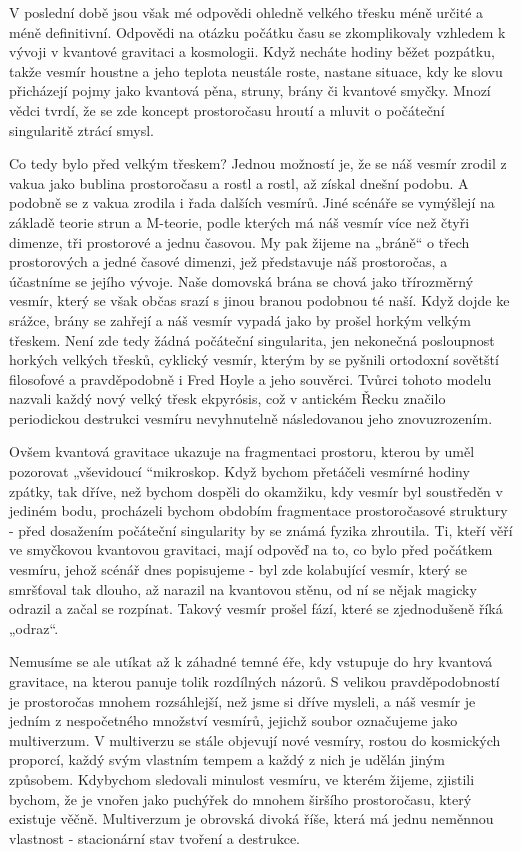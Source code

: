   V poslední době jsou však mé odpovědi ohledně velkého třesku méně určité a méně definitivní.
  Odpovědi na otázku počátku času se zkomplikovaly vzhledem k vývoji v kvantové gravitaci a
  kosmologii. Když necháte hodiny běžet pozpátku, takže vesmír houstne a jeho teplota neustále
  roste, nastane situace, kdy ke slovu přicházejí pojmy jako kvantová pěna, struny, brány či
  kvantové smyčky. Mnozí vědci tvrdí, že se zde koncept prostoročasu hroutí a mluvit o počáteční
  singularitě ztrácí smysl. 
  
  Co tedy bylo před velkým třeskem? Jednou možností je, že se náš vesmír zrodil z vakua jako bublina
  prostoročasu a rostl a rostl, až získal dnešní podobu. A podobně se z vakua zrodila i řada dalších
  vesmírů. Jiné scénáře se vymýšlejí na základě teorie strun a M-teorie, podle kterých má náš vesmír
  více než čtyři dimenze, tři prostorové a jednu časovou. My pak žijeme na „bráně“ o třech
  prostorových a jedné časové dimenzi, jež představuje náš prostoročas, a účastníme se jejího
  vývoje. Naše domovská brána se chová jako třírozměrný vesmír, který se však občas srazí s jinou
  branou podobnou té naší. Když dojde ke srážce, brány se zahřejí a náš vesmír vypadá jako by prošel
  horkým velkým třeskem. Není zde tedy žádná počáteční singularita, jen nekonečná posloupnost
  horkých velkých třesků, cyklický vesmír, kterým by se pyšnili ortodoxní sovětští filosofové a
  pravděpodobně i Fred Hoyle a jeho souvěrci. Tvůrci tohoto modelu nazvali každý nový velký třesk
  ekpyrósis, což v antickém Řecku značilo periodickou destrukci vesmíru nevyhnutelně následovanou
  jeho znovuzrozením.
  
  Ovšem kvantová gravitace ukazuje na fragmentaci prostoru, kterou by uměl pozorovat „vševidoucí
  “mikroskop. Když bychom přetáčeli vesmírné hodiny zpátky, tak dříve, než bychom dospěli do
  okamžiku, kdy vesmír byl soustředěn v jediném bodu, procházeli bychom obdobím fragmentace
  prostoročasové struktury - před dosažením počáteční singularity by se známá fyzika zhroutila. Ti,
  kteří věří ve smyčkovou kvantovou gravitaci, mají odpověď na to, co bylo před počátkem vesmíru,
  jehož scénář dnes popisujeme - byl zde kolabující vesmír, který se smršťoval tak dlouho, až
  narazil na kvantovou stěnu, od ní se nějak magicky odrazil a začal se rozpínat. Takový vesmír
  prošel fází, které se zjednodušeně říká „odraz“. 
  
  Nemusíme se ale utíkat až k záhadné temné éře, kdy vstupuje do hry kvantová gravitace, na kterou
  panuje tolik rozdílných názorů. S velikou pravděpodobností je prostoročas mnohem rozsáhlejší, než
  jsme si dříve mysleli, a náš vesmír je jedním z nespočetného množství vesmírů, jejichž soubor
  označujeme jako multiverzum. V multiverzu se stále objevují nové vesmíry, rostou do kosmických
  proporcí, každý svým vlastním tempem a každý z nich je udělán jiným způsobem. Kdybychom sledovali
  minulost vesmíru, ve kterém žijeme, zjistili bychom, že je vnořen jako puchýřek do mnohem širšího
  prostoročasu, který existuje věčně. Multiverzum je obrovská divoká říše, která má jednu neměnnou
  vlastnost - stacionární stav tvoření a destrukce. 
  
